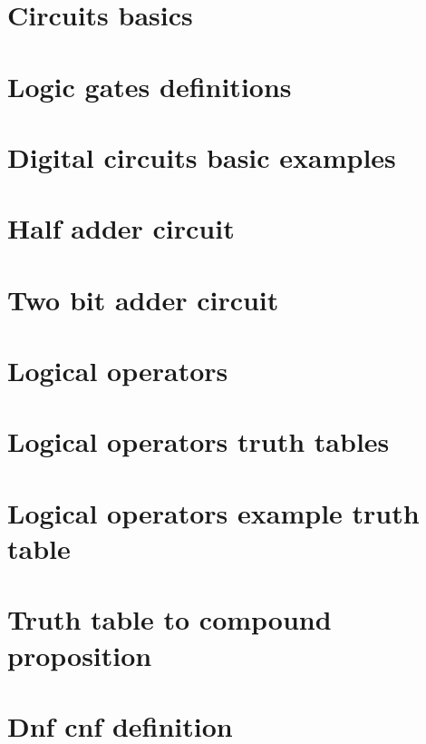 \section*{Circuits basics}

\vfill
\section*{Logic gates definitions}

\vfill
\section*{Digital circuits basic examples}

\vfill
\section*{Half adder circuit}

\vfill
\section*{Two bit adder circuit}

\vfill
\section*{Logical operators}

\vfill
\section*{Logical operators truth tables}

\vfill
\section*{Logical operators example truth table}

\vfill
\section*{Truth table to compound proposition}

\vfill
\section*{Dnf cnf definition}

\vfill
